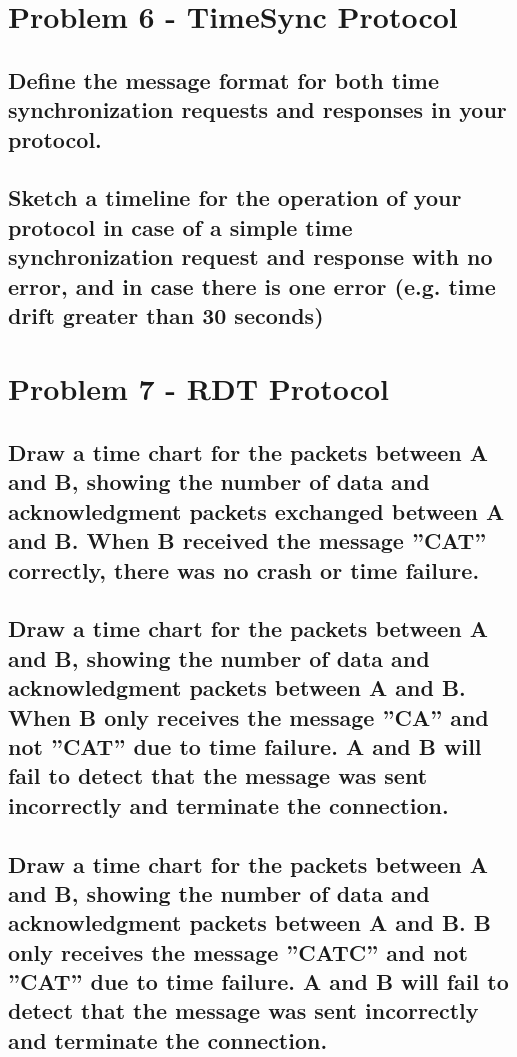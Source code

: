 \documentclass{article}
\begin{document}
\section{Problem 6 - TimeSync Protocol}

\subsection{Define the message format for both time synchronization requests and responses
in your protocol.}

\subsection{Sketch a timeline for the operation of your protocol in case of a simple time
synchronization request and response with no error, and in case there is one error (e.g.
time drift greater than 30 seconds)}

\section{Problem 7 - RDT Protocol}

\subsection{Draw a time chart for the packets between A and B, showing the number of
data and acknowledgment packets exchanged between A and B. When B received the
message ”CAT” correctly, there was no crash or time failure.}

\subsection{Draw a time chart for the packets between A and B, showing the number of
data and acknowledgment packets between A and B. When B only receives the message
”CA” and not ”CAT” due to time failure. A and B will fail to detect that the message
was sent incorrectly and terminate the connection.}

\subsection{Draw a time chart for the packets between A and B, showing the number of
data and acknowledgment packets between A and B. B only receives the message ”CATC”
and not ”CAT” due to time failure. A and B will fail to detect that the message was sent
incorrectly and terminate the connection.}
\end{document}
